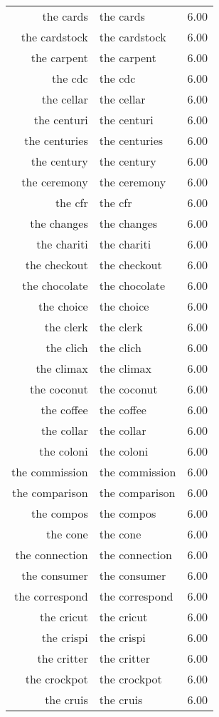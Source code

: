\begin{table}[ht]
\begin{tabular}{rlr}
  the cards & the cards & 6.00 \\ 
  the cardstock & the cardstock & 6.00 \\ 
  the carpent & the carpent & 6.00 \\ 
  the cdc & the cdc & 6.00 \\ 
  the cellar & the cellar & 6.00 \\ 
  the centuri & the centuri & 6.00 \\ 
  the centuries & the centuries & 6.00 \\ 
  the century & the century & 6.00 \\ 
  the ceremony & the ceremony & 6.00 \\ 
  the cfr & the cfr & 6.00 \\ 
  the changes & the changes & 6.00 \\ 
  the chariti & the chariti & 6.00 \\ 
  the checkout & the checkout & 6.00 \\ 
  the chocolate & the chocolate & 6.00 \\ 
  the choice & the choice & 6.00 \\ 
  the clerk & the clerk & 6.00 \\ 
  the clich & the clich & 6.00 \\ 
  the climax & the climax & 6.00 \\ 
  the coconut & the coconut & 6.00 \\ 
  the coffee & the coffee & 6.00 \\ 
  the collar & the collar & 6.00 \\ 
  the coloni & the coloni & 6.00 \\ 
  the commission & the commission & 6.00 \\ 
  the comparison & the comparison & 6.00 \\ 
  the compos & the compos & 6.00 \\ 
  the cone & the cone & 6.00 \\ 
  the connection & the connection & 6.00 \\ 
  the consumer & the consumer & 6.00 \\ 
  the correspond & the correspond & 6.00 \\ 
  the cricut & the cricut & 6.00 \\ 
  the crispi & the crispi & 6.00 \\ 
  the critter & the critter & 6.00 \\ 
  the crockpot & the crockpot & 6.00 \\ 
  the cruis & the cruis & 6.00 \\ 

\end{tabular}
\end{table}
